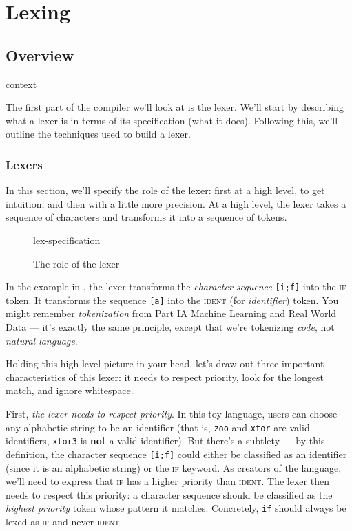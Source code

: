 \chapter{Lexing}

\section{Overview}
\begin{center}
{context}
\end{center}

The first part of the compiler we'll look at is the lexer. We'll start by describing what a lexer is in terms of its specification (what it does). Following this, we'll outline the techniques used to build a lexer.


\subsection{Lexers}
In this section, we'll specify the role of the lexer: first at a high level, to get intuition, and then with a little more precision. At a high level, the lexer takes a sequence of characters and transforms it into a sequence of tokens.  

\begin{figure}[H]
\centering
{lex-specification}
\caption{The role of the lexer}
\label{fig:lex-specification}
\end{figure}

In the example in , the lexer transforms the \emph{character sequence} \texttt{[i;f]} into the \textsc{if} token. It transforms the sequence \texttt{[a]} into the \textsc{ident} (for \emph{identifier}) token. You might remember \emph{tokenization} from {\sffamily Part IA Machine Learning and Real World Data} --- it's exactly the same principle, except that we're tokenizing \textit{code}, not \textit{natural language}. 

Holding this high level picture in your head, let's draw out three important characteristics of this lexer: it needs to respect priority, look for the longest match, and ignore whitespace.

First, \emph{the lexer needs to respect priority}. In this toy language, users can choose any alphabetic string to be an identifier (that is, \texttt{zoo} and \texttt{xtor} are valid identifiers, \texttt{xtor3} is \textbf{not} a valid identifier). But there's a subtlety --- by this definition, the character sequence \texttt{[i;f]} could either be classified as an identifier (since it is an alphabetic string) or the \textsc{if} keyword. As creators of the language, we'll need to express that \textsc{if} has a higher priority than \textsc{ident}. The lexer then needs to respect this priority: a character sequence should be classified as the \textit{highest priority} token whose pattern it matches. Concretely, \texttt{if} should always be lexed as \textsc{if} and never \textsc{ident}. 

